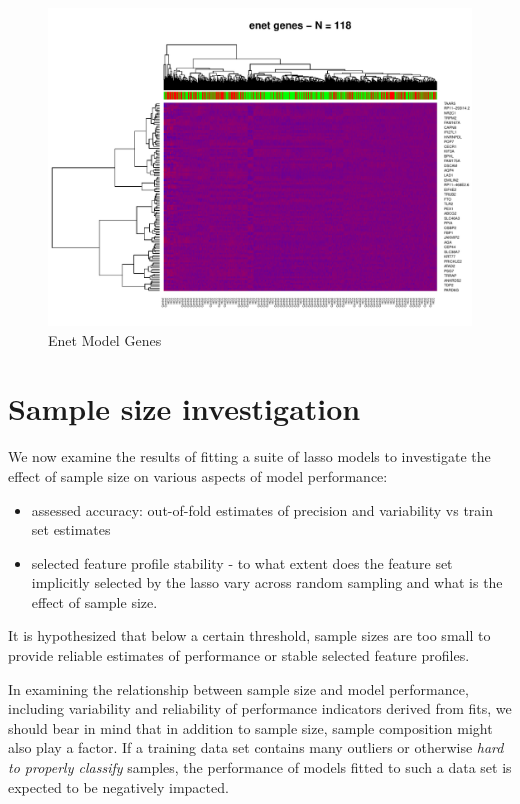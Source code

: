 \documentclass[
]{book}
\begin{document}
\begin{figure}
\centering
\includegraphics{Static/figures/heatmapEnet-1.pdf}
\caption{\label{fig:heatmapEnet}Enet Model Genes}
\end{figure}

\hypertarget{model-suite}{%
\chapter{Sample size investigation}\label{model-suite}}

We now examine the results of fitting a suite of lasso models to
investigate the effect of sample size on
various aspects of model performance:

\begin{itemize}
\item
  assessed accuracy: out-of-fold estimates of precision and variability vs train set estimates
\item
  selected feature profile stability - to what extent does the
  feature set implicitly selected by the lasso vary across random
  sampling and what is the effect of sample size.
\end{itemize}

It is hypothesized that below a certain threshold,
sample sizes are too small to provide reliable estimates
of performance or stable selected feature profiles.

In examining the relationship between sample size and
model performance, including variability and reliability
of performance indicators derived from fits, we should bear in
mind that in addition to sample size, sample composition might
also play a factor. If a training data set contains many outliers
or otherwise \emph{hard to properly classify} samples, the performance
of models fitted to such a data set is expected to be negatively impacted.
\end{document}
